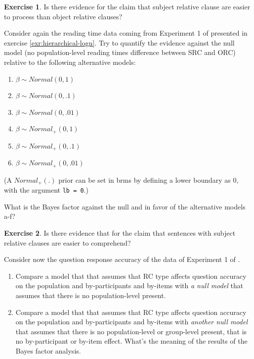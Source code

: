 \documentclass[12pt,]{krantz}
\providecommand{\tightlist}{%
  \setlength{\itemsep}{0pt}\setlength{\parskip}{0pt}}
\theoremstyle{definition}
\theoremstyle{definition}
\theoremstyle{definition}
\newtheorem{exercise}{Exercise}[chapter]
\theoremstyle{remark}
\begin{document}
\begin{exercise}
\protect\hypertarget{exr:bf-logn}{}{\label{exr:bf-logn} }Is there evidence for the claim that subject relative clause are easier to process than object relative clauses?
\end{exercise}

Consider again the reading time data coming from Experiment 1 of \citet{grodner} presented in exercise \ref{exr:hierarchical-logn}. Try to quantify the evidence against the null model (no population-level reading times difference between SRC and ORC) relative to the following alternative models:

\begin{enumerate}
\def\labelenumi{\alph{enumi}.}
\tightlist
\item
  \(\beta \sim Normal(0, 1)\)
\item
  \(\beta \sim Normal(0, .1)\)
\item
  \(\beta \sim Normal(0, .01)\)
\item
  \(\beta \sim Normal_+(0, 1)\)
\item
  \(\beta \sim Normal_+(0, .1)\)
\item
  \(\beta \sim Normal_+(0, .01)\)
\end{enumerate}

(A \(Normal_+(.)\) prior can be set in brms by defining a lower boundary as 0, with the argument \texttt{lb\ =\ 0}.)

What is the Bayes factor against the null and in favor of the alternative models a-f?

\begin{exercise}
\protect\hypertarget{exr:bf-logistic}{}{\label{exr:bf-logistic} }Is there evidence that for the claim that sentences with subject relative clauses are easier to comprehend?
\end{exercise}

\vspace{-.5cm}

Consider now the question response accuracy of the data of Experiment 1 of \citet{grodner}.

\begin{enumerate}
\def\labelenumi{\alph{enumi}.}
\tightlist
\item
  Compare a model that that assumes that RC type affects question accuracy on the population and by-participants and by-items with \emph{a null model} that assumes that there is no population-level present.
\item
  Compare a model that that assumes that RC type affects question accuracy on the population and by-participants and by-items with \emph{another null model} that assumes that there is no population-level or group-level present, that is no by-participant or by-item effect. What's the meaning of the results of the Bayes factor analysis.
\end{enumerate}
\end{document}
